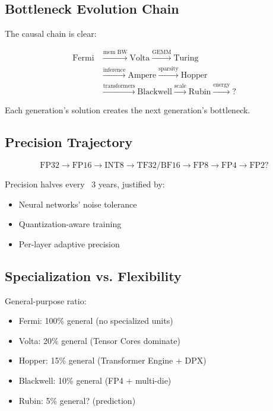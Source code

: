 \documentclass{article}
\begin{document}
\subsection{Bottleneck Evolution Chain}

The causal chain is clear:

\begin{equation}
\begin{aligned}
\text{Fermi} &\xrightarrow{\text{mem BW}} \text{Volta} \xrightarrow{\text{GEMM}} \text{Turing} \\
&\xrightarrow{\text{inference}} \text{Ampere} \xrightarrow{\text{sparsity}} \text{Hopper} \\
&\xrightarrow{\text{transformers}} \text{Blackwell} \xrightarrow{\text{scale}} \text{Rubin} \xrightarrow{\text{energy}} \text{?}
\end{aligned}
\end{equation}

Each generation's solution creates the next generation's bottleneck.

\subsection{Precision Trajectory}

\begin{equation}
\text{FP32} \to \text{FP16} \to \text{INT8} \to \text{TF32/BF16} \to \text{FP8} \to \text{FP4} \to \text{FP2?}
\end{equation}

Precision halves every ~3 years, justified by:
\begin{itemize}
\item Neural networks' noise tolerance
\item Quantization-aware training
\item Per-layer adaptive precision
\end{itemize}

\subsection{Specialization vs. Flexibility}

General-purpose ratio:
\begin{itemize}
\item Fermi: 100\% general (no specialized units)
\item Volta: 20\% general (Tensor Cores dominate)
\item Hopper: 15\% general (Transformer Engine + DPX)
\item Blackwell: 10\% general (FP4 + multi-die)
\item Rubin: 5\% general? (prediction)
\end{itemize}
\end{document}
